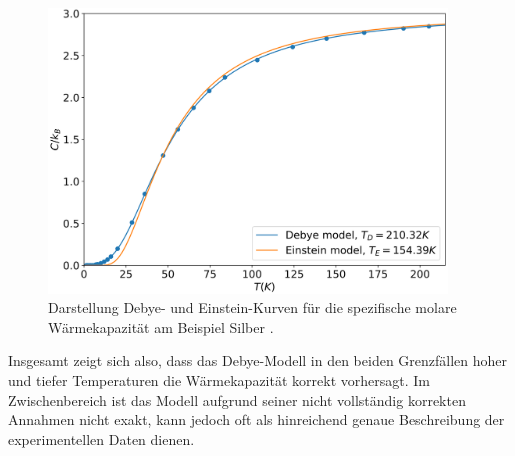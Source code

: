 \begin{figure}
  \centering
  \includegraphics[width=300pt]{data/debyeEinsteinTheory.png}
  \caption{Darstellung Debye- und Einstein-Kurven für die spezifische molare Wärmekapazität am Beispiel Silber \cite{debyeEinstein}.}
  \label{fig:debyeEinstein}
\end{figure}

Insgesamt zeigt sich also, dass das Debye-Modell in den beiden Grenzfällen hoher und tiefer Temperaturen die Wärmekapazität korrekt vorhersagt. Im Zwischenbereich ist das Modell aufgrund seiner nicht vollständig korrekten Annahmen nicht exakt, kann jedoch oft als hinreichend genaue Beschreibung der experimentellen Daten dienen.
